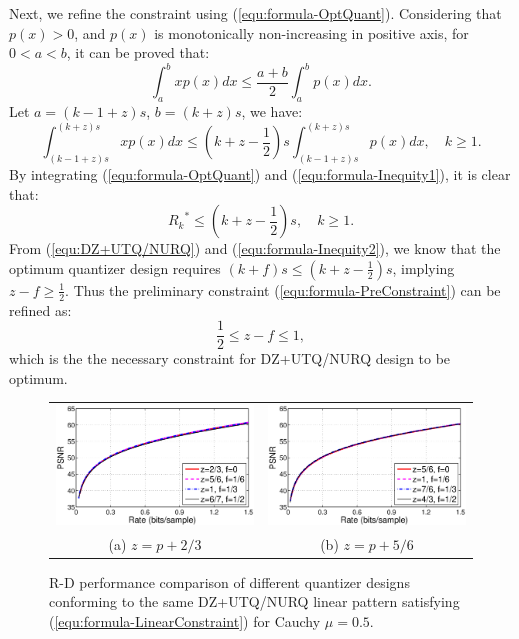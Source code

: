 \documentclass[smallabstract,smallcaptions]{dccpaper}
\begin{document}
Next, we refine the constraint using (\ref{equ:formula-OptQuant}). Considering that $p(x) > 0$, and $p(x)$ is monotonically non-increasing in positive axis, for $0 < a < b$, it can be proved that:
\begin{equation}\label{equ:formula-Inequity}
	\int_a^b xp(x)dx \le \frac{a+b}{2} \int_a^b p(x)dx.
\end{equation}
Let $a=(k-1+z)s$, $b=(k+z)s$, we have:
\begin{equation}\label{equ:formula-Inequity1}
	\int_{(k-1+z)s}^{(k+z)s} xp(x)dx \le (k+z-\frac{1}{2}) s \int_{(k-1+z)s}^{(k+z)s} p(x)dx, \quad k \ge 1.
\end{equation}
By integrating (\ref{equ:formula-OptQuant}) and (\ref{equ:formula-Inequity1}), it is clear that:
\begin{equation}\label{equ:formula-Inequity2}
	{R_k}^* \le (k+z-\frac{1}{2})s, \quad k \ge 1.
\end{equation}
From (\ref{equ:DZ+UTQ/NURQ}) and (\ref{equ:formula-Inequity2}), we know that the optimum quantizer design requires $(k+f)s \le (k+z-\frac{1}{2})s$, implying $z-f \ge \frac{1}{2}$. Thus the preliminary constraint (\ref{equ:formula-PreConstraint}) can be refined as:
\begin{equation}\label{equ:formula-RefConstraint}
	\frac{1}{2} \le z - f \le 1,
\end{equation}
which is the the necessary constraint for DZ+UTQ/NURQ design to be optimum.

\begin{figure}
\begin{center}
\begin{tabular}{cc}
\includegraphics[width = 0.5\linewidth]{Figures/section4/RD_Cauchy_mu=0_5_z=p+0_67} &
\includegraphics[width = 0.5\linewidth]{Figures/section4/RD_Cauchy_mu=0_5_z=p+0_83} \\
{\small (a) $z=p+2/3$} & {\small (b) $z=p+5/6$} 
\end{tabular}
\end{center}
\vspace{-20pt}
\caption{\label{fig:RD_same_pattern}
R-D performance comparison of different quantizer designs conforming to the same DZ+UTQ/NURQ linear pattern satisfying (\ref{equ:formula-LinearConstraint}) for Cauchy $\mu=0.5$.}
\end{figure}
\end{document}
